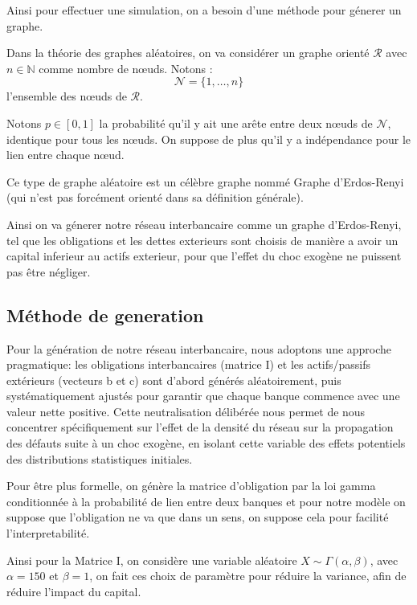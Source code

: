 Ainsi pour effectuer une simulation, on a besoin d'une méthode pour génerer un graphe.

Dans la théorie des graphes aléatoires, on va considérer un graphe orienté $\mathcal{R}$ avec $n \in \mathbb{N}$ comme nombre de nœuds.
Notons :
$$\mathcal{N} = \{1,\ldots, n\} $$
l'ensemble des nœuds de $\mathcal{R}$.

Notons $p \in [0,1]$ la probabilité qu'il y ait une arête entre deux nœuds de $\mathcal{N}$, identique pour tous les nœuds.
On suppose de plus qu'il y a indépendance pour le lien entre chaque nœud.

Ce type de graphe aléatoire est un célèbre graphe nommé Graphe d'Erdos-Renyi (qui n'est pas forcément orienté dans sa définition générale).

Ainsi on va génerer notre réseau interbancaire comme un graphe d'Erdos-Renyi, tel que les obligations et les dettes exterieurs sont choisis de manière a avoir un capital inferieur au actifs exterieur, pour que l'effet du choc exogène
ne puissent pas être négliger.

\subsection{Méthode de generation}\label{subsec:methode-de-generation}
Pour la génération de notre réseau interbancaire, nous adoptons une approche pragmatique:
les obligations interbancaires (matrice I) et les actifs/passifs extérieurs (vecteurs b et c) sont
d'abord générés aléatoirement, puis systématiquement ajustés pour garantir que chaque banque
commence avec une valeur nette positive.
Cette neutralisation délibérée nous permet de nous concentrer spécifiquement sur
l'effet de la densité du réseau sur la propagation des défauts suite à un choc exogène,
en isolant cette variable des effets potentiels des distributions statistiques initiales.

\vspace{0.45cm}
Pour être plus formelle, on génère la matrice d'obligation par la loi gamma conditionnée à la probabilité de lien entre
deux banques et pour notre modèle on suppose que l'obligation ne va que dans un sens,
on suppose cela pour facilité l'interpretabilité.

\vspace{0.45cm}
Ainsi pour la Matrice I, on considère une variable aléatoire $X \sim \Gamma(\alpha, \beta)$, avec $\alpha = 150$ et $\beta = 1$, on fait ces choix de paramètre pour réduire la variance, afin de réduire
l'impact du capital.

